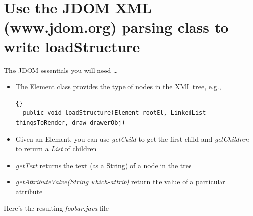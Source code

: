 \documentclass[11pt,letterpaper]{book}
\begin{document}
\section{Use the JDOM XML (www.jdom.org) parsing class to write loadStructure}

The JDOM essentials you will need \ldots

\begin{itemize}
\item The Element class provides the type of nodes in the XML tree, e.g., 
  \begin{lstlisting}{}
  public void loadStructure(Element rootEl, LinkedList thingsToRender, draw drawerObj)
  \end{lstlisting}
  
\item Given an Element, you can use \textit{getChild} to get the first
  child and \textit{getChildren} to return a \textit{List} of children


\item \textit{getText} returns the text (as a String) of a node in the tree
\item \textit{getAttributeValue(String which-attrib)} return the value of a particular attribute
\end{itemize}

Here's the resulting \textit{foobar.java} file
\end{document}
